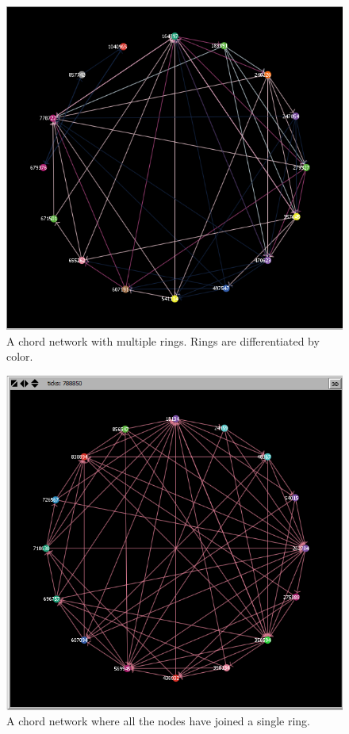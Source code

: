 \documentclass[12pt]{ieeetran} %
\begin{document}
\begin{figure}
\includegraphics[width=\linewidth]{example_problem}
\caption{A chord network with multiple rings.  Rings are differentiated by color.}
\label{problem}
\end{figure}

\begin{figure}
\includegraphics[width=\linewidth]{fixed_example}
\caption{A chord network where all the nodes have joined a single ring.}
\label{fixed}
\end{figure}
\end{document}
